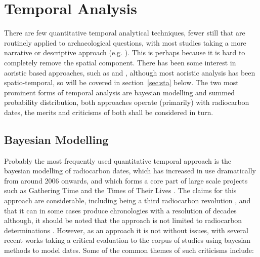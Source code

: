 \section{Temporal Analysis}
There are few quantitative temporal analytical techniques, fewer still that are routinely applied to archaeological questions, with most studies taking a more narrative or descriptive approach (e.g. \citealp{Bradley:2002fk,Bailey:2007fk}). This is perhaps because it is hard to completely remove the spatial component. There has been some interest in aoristic based approaches, such as \citet{Crema2012} and \citet{Baxter2016120}, although most aoristic analysis has been spatio-temporal, so will be covered in section~\ref{sec:sta} below. The two most prominent forms of temporal analysis are bayesian modelling and summed probability distribution, both approaches operate (primarily) with radiocarbon dates, the merits and criticisms of both shall be considered in turn.

\subsection{Bayesian Modelling}
Probably the most frequently used quantitative temporal approach is the bayesian modelling of radiocarbon dates, which has increased in use dramatically from around 2006 onwards, \citep[679]{doi:10.1080/00438243.2015.1067640} and which forms a core part of large scale projects such as Gathering Time \citep{Whittle:2011kl,Whittle:2011tg} and the Times of Their Lives \citep{whittle2018times}. The claims for this approach are considerable, including being a third radiocarbon revolution \citep[126]{azu_rc3483}, and that it can in some cases produce chronologies with a resolution of decades \citep[141]{azu_rc3483} although, it should be noted that the approach is not limited to radiocarbon determinations \citep{Millard:2003fk}. However, as an approach it is not without issues, with several recent works taking a critical evaluation to the corpus of studies using bayesian methods to model dates\citep[e.g.][]{doi:10.1080/00438243.2015.1070082,doi:10.1080/00438243.2015.1053977,doi:10.1080/00438243.2015.1065759}. Some of the common themes of such criticisms include:

